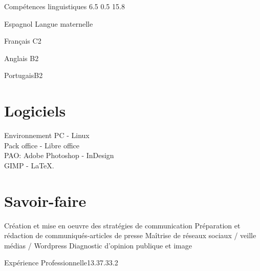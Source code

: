 \documentclass[30pt, french]{tccv}
\begin{document}
\begin{upshape}
\begin{rounded_frame}{Compétences linguistiques}{ 6.5 } { 0.5 }{ 15.8 }{}


\begin{factlist}
\item{Espagnol} {Langue maternelle}	
\item{Français} {C2}	
\item{Anglais}  {B2}	
\item{Portugais}{B2}
\end{factlist}

\vspace{0.5cm}
\section{Logiciels}
Environnement PC - Linux \\
Pack office - Libre office \\
PAO: Adobe Photoshop - InDesign \\
GIMP -
\LaTeX.

\vspace{0.1cm}
\section{Savoir-faire}
\begin{itemize}[leftmargin=13pt]
  \cvitem[\checkmark]  Création et mise en oeuvre des stratégies de communication
  \cvitem[\checkmark]  Préparation et rédaction de communiqués-articles de presse
  \cvitem[\checkmark]  Maîtrise de réseaux sociaux / veille médias / Wordpress
  \cvitem[\checkmark]  Diagnostic d'opinion publique et image 
 
\end{itemize}



\end{rounded_frame}




%
%



\begin{flat_frame}{Expérience Professionnelle}{13.3}{7.3}{3.2}{}
\begin{eventlist}




\end{eventlist}
\end{flat_frame}
\end{upshape}
\end{document}
